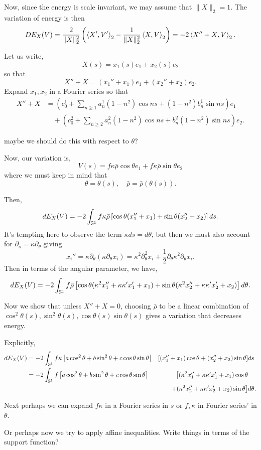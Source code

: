 \documentclass[12pt]{article}
\begin{document}
Now, since the energy is scale invariant, we may assume that \(\|X\|_2 = 1\). The variation of energy is then
\[
DE_X (V) = \frac{2}{\|X\|_2^2} \left(\left\langle{X'},{V'}\right\rangle_2 - \frac{1}{\|X\|_2^2}\left\langle{X},{V}\right\rangle_2\right) = -2 \left\langle{X'' + X},{V}\right\rangle_2.
\]

Let us write,
\[
X(s) = x_1(s) e_1 + x_2(s) e_2
\]
so that
\[
X'' + X = (x_1'' + x_1)e_1 + (x_2'' + x_2)e_2.
\]
Expand \(x_1, x_2\) in a Fourier series so that
\[
\begin{split}
X'' + X &= (c_0^1 + \sum_{n\geq 1} a_n^1 (1-n^2)\cos ns + (1-n^2)b_n^1 \sin ns) e_1 \\
&\quad + (c_0^2 + \sum_{n\geq 2} a_n^2 (1-n^2)\cos ns + b_n^2 (1-n^2) \sin ns) e_2.
\end{split}
\]

{\color{red} maybe we should do this with respect to \(\theta\)?}

Now, our variation is,
\[
V(s) = f\kappa\bar{\rho} \cos\theta e_1 + f\kappa\bar{\rho} \sin\theta e_2
\]
where we must keep in mind that
\[
\theta = \theta(s), \quad \bar{\rho} = \bar{\rho}(\theta(s)).
\]

Then,
\[
dE_X (V) = -2 \int_{\operatorname{\mathbb{S}^1}} f\kappa\bar{\rho} \left[\cos\theta (x_1'' + x_1) + \sin\theta (x_2'' + x_2) \right] ds.
\]
It's tempting here to observe the term \(\kappa ds = d\theta\), but then we must also account for \(\partial_s = \kappa \partial_{\theta}\) giving
\[
x_i'' = \kappa \partial_{\theta} (\kappa \partial_\theta x_i) = \kappa^2 \partial_{\theta}^2 x_i + \frac{1}{2} \partial_{\theta} \kappa^2 \partial_{\theta} x_i.
\]
Then in terms of the angular parameter, we have,
\[
dE_X (V) = -2 \int_{\operatorname{\mathbb{S}^1}} f \bar{\rho} \left[\cos\theta (\kappa^2 x_1'' + \kappa\kappa' x_1 ' + x_1) + \sin\theta (\kappa^2 x_2'' + \kappa\kappa' x_2 ' + x_2) \right] d\theta.
\]

Now we show that unless \(X'' + X = 0\), choosing \(\bar{\rho}\) to be a linear combination of \(\cos^2\theta(s), \sin^2\theta(s), \cos\theta(s)\sin\theta(s)\) gives a variation that decreases energy.

Explicitly,
\begin{align*}
dE_X (V) &= -2 \int_{\operatorname{\mathbb{S}^1}} f\kappa\left[a \cos^2\theta + b \sin^2\theta + c \cos\theta \sin\theta\right] & \left[(x_1'' + x_1) \cos\theta + (x_2'' + x_2) \sin\theta \right] & ds \\
&= -2 \int_{\operatorname{\mathbb{S}^1}} f\left[a \cos^2\theta + b \sin^2\theta + c \cos\theta \sin\theta\right] & \big[(\kappa^2 x_1'' + \kappa\kappa' x_1 ' + x_1) \cos\theta & \\
&\quad & + (\kappa^2 x_2'' + \kappa\kappa' x_2 ' + x_2) \sin\theta \big] & d\theta.
\end{align*}

{\color{red} Next perhaps we can expand \(f\kappa\) in a Fourier series in \(s\) or \(f, \kappa\) in Fourier series' in \(\theta\).}

{\color{red}Or perhaps now we try to apply affine inequalities. Write things in terms of the support function?}
\end{document}
